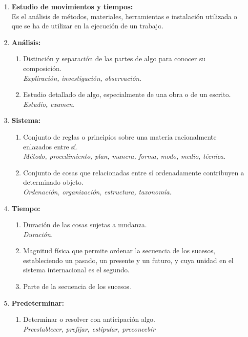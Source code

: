 \begin{enumerate}
\item \textbf{Estudio de movimientos y tiempos: }
\\ Es el análisis de métodos, materiales, herramientas e instalación utilizada o que se ha de utilizar en la ejecución de un trabajo.
\\ \cite{DiapositivasSema-2-21}

\item \textbf{Análisis: }
\begin{enumerate}
    \item Distinción y separación de las partes de algo para conocer su composición.
    \\ \textit{Expliración, investigación, observación.}
    \item Estudio detallado de algo, especialmente de una obra o de un escrito.
    \\ \textit{Estudio, examen.}
    \\ \cite{RAE}
\end{enumerate}

\item \textbf{Sistema: }
\begin{enumerate}
    \item Conjunto de reglas o principios sobre una materia racionalmente enlazados entre sí.
    \\ \textit{Método, procedimiento, plan, manera, forma, modo, medio, técnica.}
    \item Conjunto de cosas que relacionadas entre sí ordenadamente contribuyen a determinado objeto.
    \\ \textit{Ordenación, organización, estructura, taxonomía.}
    \\ \cite{RAE}
\end{enumerate}

\item \textbf{Tiempo: }
\begin{enumerate}
    \item Duración de las cosas sujetas a mudanza.
    \\\textit{Duración.}
    \item Magnitud física que permite ordenar la secuencia de los sucesos, estableciendo un pasado, un presente y un futuro, y cuya unidad en el sistema internacional es el segundo.
    \item Parte de la secuencia de los sucesos.
    \\ \cite{RAE}
\end{enumerate}

\item \textbf{Predeterminar: }
\begin{enumerate}
    \item Determinar o resolver con anticipación algo.
    \\ \textit{Preestablecer, prefijar, estipular, preconcebir}
    \\ \cite{RAE}
\end{enumerate}


\end{enumerate}
